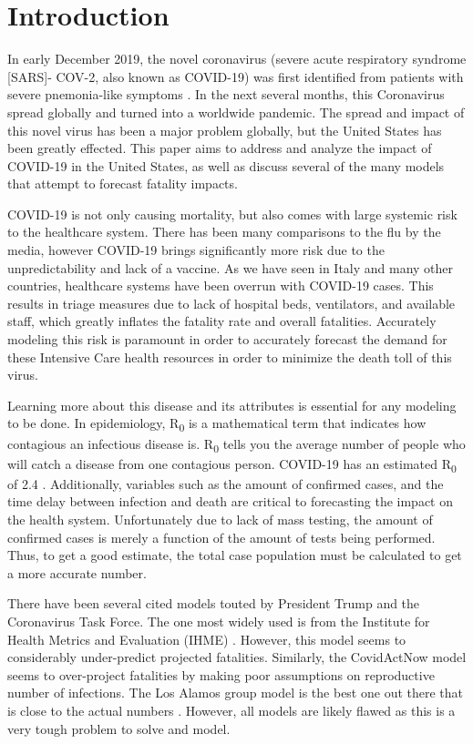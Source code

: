 \section{Introduction}
\label{Intro}

In early December 2019, the novel coronavirus (severe acute respiratory syndrome [SARS]- COV-2, also known as COVID-19) was first identified from patients with severe pnemonia-like symptoms \cite{long} .  In the next several months, this Coronavirus spread globally and turned into a worldwide pandemic.  The spread and impact of this novel virus has been a major problem globally, but the United States has been greatly effected.  This paper aims to address and analyze the impact of COVID-19 in the United States, as well as discuss several of the many models that attempt to forecast fatality impacts.  

    COVID-19 is not only causing mortality, but also comes with large systemic risk to the healthcare system.  There has been many comparisons to the flu by the media, however COVID-19 brings significantly more risk due to the unpredictability and lack of a vaccine.  As we have seen in Italy and many other countries, healthcare systems have been overrun with COVID-19 cases.  This results in triage measures due to lack of hospital beds, ventilators, and available staff, which greatly inflates the fatality rate and overall fatalities.  Accurately modeling this risk is paramount in order to accurately forecast the demand for these Intensive Care health resources in order to minimize the death toll of this virus.
    
    Learning more about this disease and its attributes is essential for any modeling to be done.  In epidemiology, R\textsubscript{0} is a mathematical term that indicates how contagious an infectious disease is.  R\textsubscript{0} tells you the average number of people who will catch a disease from one contagious person.  COVID-19 has an estimated R\textsubscript{0} of 2.4 \cite{who}.  Additionally, variables such as the amount of confirmed cases, and the time delay between infection and death are critical to forecasting the impact on the health system.  Unfortunately due to lack of mass testing, the amount of confirmed cases is merely a function of the amount of tests being performed.  Thus, to get a good estimate, the total case population must be calculated to get a more accurate number.
    
    There have been several cited models touted by President Trump and the Coronavirus Task Force.  The one most widely used is from the Institute for Health Metrics and Evaluation (IHME) \cite{imhe}.  However, this model seems to considerably under-predict projected fatalities.  Similarly, the CovidActNow model seems to over-project fatalities by making poor assumptions on reproductive number of infections\cite{covidactnow}.  The Los Alamos group model is the best one out there that is close to the actual numbers \cite{losalamos}.  However, all models are likely flawed as this is a very tough problem to solve and model. 


